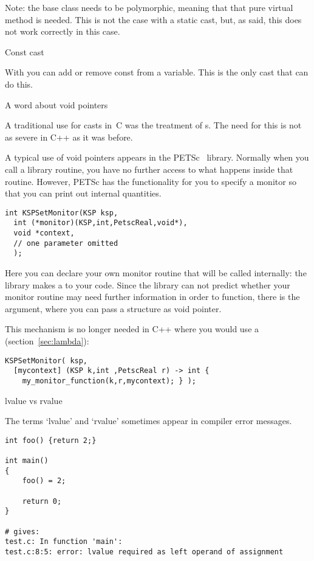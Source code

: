 Note: the base class needs to be polymorphic, meaning that that pure
virtual method is needed. This is not the case with a static cast,
but, as said, this does not work correctly in this case.

 {Const cast}

With  you can add or remove const from a
variable. This is the only cast that can do this.

 {A word about void pointers}

A traditional use for casts in~C was the treatment of
s. The need for this is not as severe in
C++ as it was before.

A typical use of void pointers appears in the
PETSc~\cite{petsc-efficient,petsc-home-page} library. Normally when
you call a library routine, you have no further access to what happens
inside that routine. However, PETSc has the functionality for you to
specify a monitor so that you can print out internal quantities.
\begin{verbatim}
int KSPSetMonitor(KSP ksp,
  int (*monitor)(KSP,int,PetscReal,void*),
  void *context,
  // one parameter omitted
  );
\end{verbatim}
Here you can declare your own monitor routine that will be called
internally: the library makes a  to your code.
Since the library can not predict whether your monitor routine may
need further information in order to function, there is the
 argument, where you can pass a structure as void pointer.

This mechanism is no longer needed in C++ where you would use a
 (section~\ref{sec:lambda}):
\begin{verbatim}
KSPSetMonitor( ksp,
  [mycontext] (KSP k,int ,PetscReal r) -> int {
    my_monitor_function(k,r,mycontext); } );
\end{verbatim}


 {lvalue vs rvalue}
\label{sec:lrvalue}

The terms `lvalue' and `rvalue' sometimes appear in compiler error
messages.
\begin{verbatim}
int foo() {return 2;}

int main()
{
    foo() = 2;

    return 0;
}

# gives:
test.c: In function 'main':
test.c:8:5: error: lvalue required as left operand of assignment
\end{verbatim}

